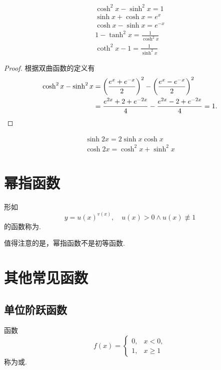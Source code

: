 \begin{theorem}
\begin{gather}
\cosh^2{x} - \sinh^2{x} = 1 \\
\sinh{x} + \cosh{x} = e^x \\
\cosh{x} - \sinh{x} = e^{-x} \\
1 - \tanh^2{x} = \frac{1}{\cosh^2{x}} \\
\coth^2{x} - 1 = \frac{1}{\sinh^2{x}}
\end{gather}
\begin{proof}
根据双曲函数的定义有
\begin{align*}
\cosh^2{x}-\sinh^2{x}
&=\left(\frac{e^x + e^{-x}}{2}\right)^2-\left(\frac{e^x - e^{-x}}{2}\right)^2 \\
&=\frac{e^{2x}+2+e^{-2x}}{4}-\frac{e^{2x}-2+e^{-2x}}{4}
=1. \qedhere
\end{align*}
\end{proof}
\end{theorem}

\begin{theorem}
\begin{gather}
\sinh{2x} = 2 \sinh{x}\cosh{x} \\
\cosh{2x} = \cosh^2{x} + \sinh^2{x}
\end{gather}
\end{theorem}

\section{幂指函数}
\begin{definition}
形如\[
y = u(x)^{v(x)},
\quad u(x) > 0 \land u(x) \not\equiv 1
\]的函数称为.
\end{definition}
值得注意的是，幂指函数不是初等函数.

\section{其他常见函数}
\subsection{单位阶跃函数}
\begin{definition}
函数\[
f(x) = \left\{ \begin{array}{cc}
0, & x < 0, \\
1, & x \geq 1
\end{array} \right.
\]称为或.
\end{definition}

